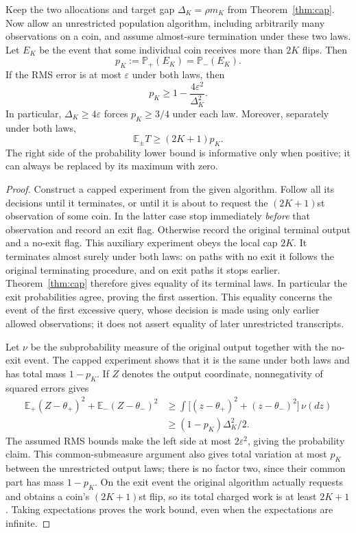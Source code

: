 \begin{theorem}\label{thm:tail}
Keep the two allocations and target gap $\Delta_K=\rho m_K$ from
Theorem~\ref{thm:cap}. Now allow an unrestricted population algorithm,
including arbitrarily many observations on a coin, and assume almost-sure
termination under these two laws. Let $E_K$ be the event that some individual
coin receives more than $2K$ flips. Then
\[
 p_K:=\mathbb P_+(E_K)=\mathbb P_-(E_K).
\]
If the RMS error is at most $\varepsilon$ under both laws, then
\[
 p_K\ge 1-\frac{4\varepsilon^2}{\Delta_K^2}.
\]
In particular, $\Delta_K\ge4\varepsilon$ forces $p_K\ge3/4$ under each law.
Moreover, separately under both laws,
\[
 \mathbb E_\pm T\ge(2K+1)p_K.
\]
The right side of the probability lower bound is informative only when
positive; it can always be replaced by its maximum with zero.
\end{theorem}
\begin{proof}
Construct a capped experiment from the given algorithm. Follow all its
decisions until it terminates, or until it is about to request the
$(2K+1)$st observation of some coin. In the latter case stop immediately
\emph{before} that observation and record an exit flag. Otherwise record
the original terminal output and a no-exit flag. This auxiliary experiment
obeys the local cap $2K$. It terminates almost surely under both laws: on
paths with no exit it follows the original terminating procedure, and on
exit paths it stops earlier. Theorem~\ref{thm:cap} therefore gives equality
of its terminal laws. In particular the exit probabilities agree, proving
the first assertion. This equality concerns the event of the first excessive
query, whose decision is made using only earlier allowed observations; it
does not assert equality of later unrestricted transcripts.

Let $\nu$ be the subprobability measure of the original output together with
the no-exit event. The capped experiment shows that it is the same under
both laws and has total mass $1-p_K$. If $Z$ denotes the output coordinate,
nonnegativity of squared errors gives
\begin{align*}
 \mathbb E_+(Z-\theta_+)^2+\mathbb E_-(Z-\theta_-)^2
 &\ge\int\bigl[(z-\theta_+)^2+(z-\theta_-)^2\bigr]\,\nu(dz)\\
 &\ge (1-p_K)\Delta_K^2/2.
\end{align*}
The assumed RMS bounds make the left side at most $2\varepsilon^2$, giving
the probability claim. This common-submeasure argument also gives total
variation at most $p_K$ between the unrestricted output laws; there is no
factor two, since their common part has mass $1-p_K$.
On the exit event the original algorithm actually requests and obtains a
coin's $(2K+1)$st flip, so its total charged work is at least $2K+1$.
Taking expectations proves the work bound, even when the expectations are
infinite.
\end{proof}

